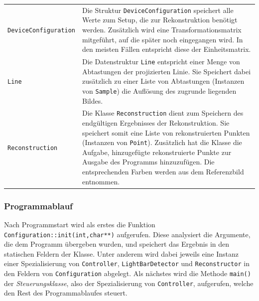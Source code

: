 \documentclass[ngerman,a4paper,parskip=half]{scrartcl}
\begin{document}
\vspace{0.5em}
\begin{tabular}{lp{10cm}}
	\texttt{DeviceConfiguration} &
		Die Struktur \texttt{DeviceConfiguration} speichert alle Werte zum Setup, die zur Rekonstruktion benötigt werden. Zusätzlich wird eine Transformationsmatrix mitgeführt, auf die später noch eingegangen wird. In den meisten Fällen entspricht diese der Einheitsmatrix.\\[1em]
	\texttt{Line}                &
		Die Datenstruktur \texttt{Line} entspricht einer Menge von Abtastungen der projizierten Linie. Sie Speichert dabei zusätzlich zu einer Liste von Abtastungen (Instanzen von \texttt{Sample}) die Auflösung des zugrunde liegenden Bildes.\\[1em]
	\texttt{Reconstruction}      &
		Die Klasse \texttt{Reconstruction} dient zum Speichern des endgültigen Ergebnisses der Rekonstruktion. Sie speichert somit eine Liste von rekonstruierten Punkten (Instanzen von \texttt{Point}). Zusätzlich hat die Klasse die Aufgabe, hinzugefügte rekonstruierte Punkte zur Ausgabe des Programms hinzuzufügen. Die entsprechenden Farben werden aus dem Referenzbild entnommen.
\end{tabular}

\subsubsection{Programmablauf}

Nach Programmstart wird als erstes die Funktion \texttt{Configuration::init(int,char**)} aufgerufen. Diese analysiert die Argumente, die dem Programm übergeben wurden, und speichert das Ergebnis in den statischen Feldern der Klasse. Unter anderem wird dabei jeweils eine Instanz einer Spezialisierung von \texttt{Controller}, \texttt{LightBarDetector} und \texttt{Reconstructor} in den Feldern von \texttt{Configuration} abgelegt. Als nächstes wird die Methode \texttt{main()} der \emph{Steuerungsklasse}, also der Spezialisierung von \texttt{Controller}, aufgerufen, welche den Rest des Programmablaufes steuert.
\end{document}
